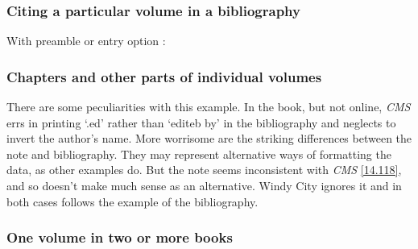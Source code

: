 \documentclass[11pt,letterpaper,oneside]{article}
\begin{document}
\subsubsection{Citing a particular volume in a bibliography}
\label{14.119}

\begin{citebib}
\item \cite{armstrong2014}
\end{citebib}

\noindent With preamble or entry option :

\begin{citebib}
\item \cite{armstrong2014}
\end{citebib}

\subsubsection{Chapters and other parts of individual volumes}
\label{14.120}

There are some peculiarities with this example. In the book, but not
online, \textit{CMS} errs in printing `.ed' rather than `editeb by' in
the bibliography and neglects to invert the author's name. More
worrisome are the striking differences between the note and
bibliography. They may represent alternative ways of formatting the
data, as other examples do. But the note seems inconsistent with
\textit{CMS} \ref{14.118}, and so doesn't make much sense as an
alternative. Windy City ignores it and in both cases follows the
example of the bibliography.

\begin{citebib}
\item \cite[180]{chen2010.3}
\end{citebib}

\subsubsection{One volume in two or more books}
\label{14.121}

\begin{citebib}
\item \cite[351]{lach1977}
\item \cite{harley1994}
\end{citebib}
\end{document}
